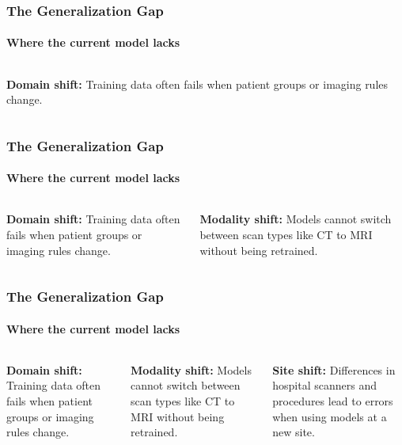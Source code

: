 \documentclass[nometaot,lecture,amberg,toc=twocolumn,indicatelastpageofframe,footlinebox]{OTHAWbeamer}
\begin{document}
\begin{frame}[t, label=gengap1]
    \frametitle{The Generalization Gap}
    \framesubtitle{Where the current model lacks}
    \begin{columns}[T]
            \vspace{0.6cm}
            \textcolor{orange1}{\textbf{Domain shift:}} Training data often fails when patient
            groups or imaging rules change.
            \centering
    \end{columns}
\end{frame}

\begin{frame}[t, label=gengap2]
    \frametitle{The Generalization Gap}
    \framesubtitle{Where the current model lacks}
    \begin{columns}[T]
            \vspace{0.6cm}
            \textcolor{orange1}{\textbf{Domain shift:}} Training data often fails when patient
            groups or imaging rules change.

            \vspace{0.6em}

            \textcolor{orange1}{\textbf{Modality shift:}} Models cannot switch between scan types
            like CT to MRI without being retrained.
            \centering
    \end{columns}
\end{frame}

\begin{frame}[t, label=gengap3]
    \frametitle{The Generalization Gap}
    \framesubtitle{Where the current model lacks}
    \begin{columns}[T]
            \vspace{0.6cm}
            \textcolor{orange1}{\textbf{Domain shift:}} Training data often fails when patient
            groups or imaging rules change.

            \vspace{0.6em}

            \textcolor{orange1}{\textbf{Modality shift:}} Models cannot switch between scan types
            like CT to MRI without being retrained.

            \vspace{0.6em}

            \textcolor{orange1}{\textbf{Site shift:}} Differences in hospital scanners and procedures
            lead to errors when using models at a new site.
            \centering
    \end{columns}

\end{frame}
\end{document}
